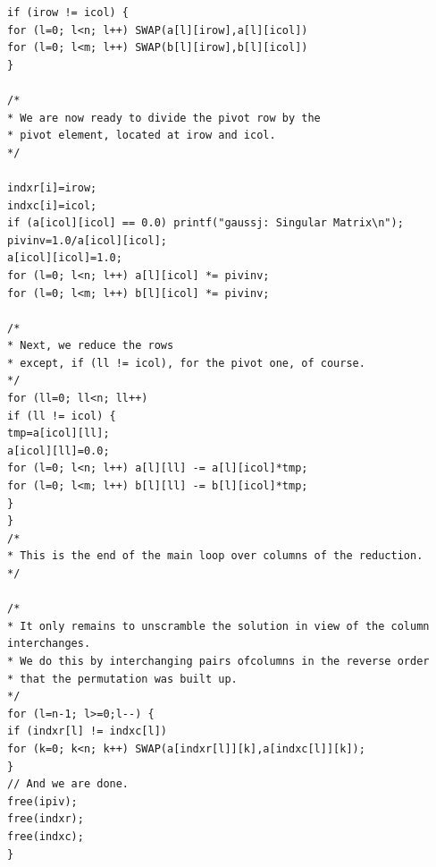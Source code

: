 \begin{verbatim}
if (irow != icol) {
for (l=0; l<n; l++) SWAP(a[l][irow],a[l][icol])
for (l=0; l<m; l++) SWAP(b[l][irow],b[l][icol])
}

/*
* We are now ready to divide the pivot row by the
* pivot element, located at irow and icol.
*/

indxr[i]=irow;
indxc[i]=icol;
if (a[icol][icol] == 0.0) printf("gaussj: Singular Matrix\n");
pivinv=1.0/a[icol][icol];
a[icol][icol]=1.0;
for (l=0; l<n; l++) a[l][icol] *= pivinv;
for (l=0; l<m; l++) b[l][icol] *= pivinv;

/*
* Next, we reduce the rows
* except, if (ll != icol), for the pivot one, of course.
*/
for (ll=0; ll<n; ll++)
if (ll != icol) {
tmp=a[icol][ll];
a[icol][ll]=0.0;
for (l=0; l<n; l++) a[l][ll] -= a[l][icol]*tmp;
for (l=0; l<m; l++) b[l][ll] -= b[l][icol]*tmp;
}
}
/*
* This is the end of the main loop over columns of the reduction.
*/

/*
* It only remains to unscramble the solution in view of the column interchanges.
* We do this by interchanging pairs ofcolumns in the reverse order
* that the permutation was built up.
*/
for (l=n-1; l>=0;l--) {
if (indxr[l] != indxc[l])
for (k=0; k<n; k++) SWAP(a[indxr[l]][k],a[indxc[l]][k]);
}
// And we are done.
free(ipiv);
free(indxr);
free(indxc);
}
\end{verbatim}


